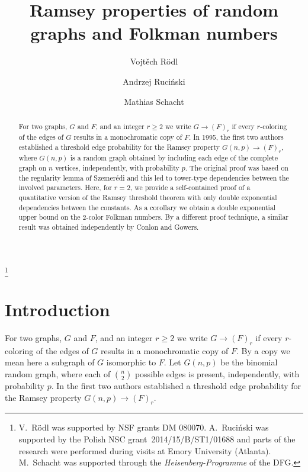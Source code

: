 \documentclass[reqno, 12pt]{amsart}
\begin{document}
\title{Ramsey properties of random graphs and Folkman numbers}

\author{Vojt\v{e}ch R\"{o}dl}
\address{Department of Mathematics and Computer Science, 
Emory University, Atlanta, USA}

\author{Andrzej Ruci\'nski}
\address{A. Mickiewicz University, Department of Discrete Mathematics, Pozna\'n, Poland}

\author{Mathias Schacht}
\address{Fachbereich Mathematik, Universit\"at Hamburg, Hamburg, Germany}

\thanks{V.~R\"odl was supported  by NSF grants DM 080070. 
	A.~Ruci\'nski was supported by the Polish NSC grant~2014/15/B/ST1/01688 
	and parts of the research 
	were performed during visits at Emory University (Atlanta).
	M.~Schacht was supported through the \emph{Heisenberg-Programme} of the DFG\@.}







\begin{abstract} For two graphs, $G$ and $F$, and an integer $r\ge2$ we write $G\rightarrow (F)_r$ if every $r$-coloring of the edges of $G$
results in a monochromatic copy of $F$. In 1995, the first two authors  established a threshold edge
probability for the Ramsey property $G(n,p)\to (F)_r$, where $G(n,p)$ is a random graph
obtained by including each edge of the complete graph on $n$ vertices, independently, with
probability $p$.  The original proof was based on the regularity lemma of
Szemer\'edi and this led to  tower-type dependencies between the involved parameters.  Here, for $r=2$, we provide  a self-contained proof of a
quantitative version of  the Ramsey threshold theorem with only double exponential dependencies between the
constants. As a corollary we obtain a double exponential upper bound on the 2-color Folkman numbers. By a different proof technique, a similar result was obtained independently
by Conlon and Gowers.
\end{abstract}

\maketitle


\section{Introduction}\label{intro}
For two graphs, $G$ and $F$, and an integer $r\ge2$ we write $G\rightarrow (F)_r$ if every $r$-coloring of the edges of $G$
results in a monochromatic copy of $F$. By a copy we mean here a subgraph of $G$ isomorphic to $F$.
Let $G(n,p)$ be the binomial random graph, where each of $\binom n2$ possible edges is present,
independently, with probability $p$.
In \cite{rr} the first two authors  established a threshold edge
probability for the Ramsey property $G(n,p)\to (F)_r$.
\end{document}
